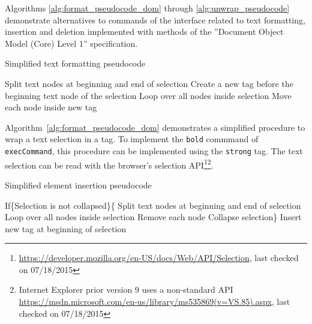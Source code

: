 Algorithms \ref{alg:format_pseudocode_dom} through \ref{alg:unwrap_pseudocode} demonstrate alternatives to commands of the  interface related to text formatting, insertion and deletion implemented with methods of the ''Document Object Model (Core) Level 1'' specification.


\begin{algorithm}
\caption{Simplified text formatting pseudocode}
\label{alg:format_pseudocode_dom}
\begin{algorithmic}[1]
\State Split text nodes at beginning and end of selection
\State Create a new tag before the beginning text node of the selection
\State Loop over all nodes inside selection
\State Move each node inside new tag
\end{algorithmic}
\end{algorithm}


Algorithm~\ref{alg:format_pseudocode_dom} demonstrates a simplified procedure to wrap a text selection in a tag. To implement the \texttt{bold} commmand of \texttt{execCommand}, this procedure can be implemented using the \texttt{strong} tag. The text selection can be read with the browser's selection API\footnote{\url{https://developer.mozilla.org/en-US/docs/Web/API/Selection}, last checked on 07/18/2015}\footnote{Internet Explorer prior version 9 uses a non-standard API \url{https://msdn.microsoft.com/en-us/library/ms535869(v=VS.85).aspx}, last checked on 07/18/2015}.


\begin{algorithm}
\caption{Simplified element insertion pseudocode}
\label{alg:insert_pseudocode}
\begin{algorithmic}[1]
\State If\{Selection is not collapsed\}\{
\State Split text nodes at beginning and end of selection
\State Loop over all nodes inside selection
\State Remove each node
\State Collapse selection\}
\State Insert new tag at beginning of selection
\end{algorithmic}
\end{algorithm}

